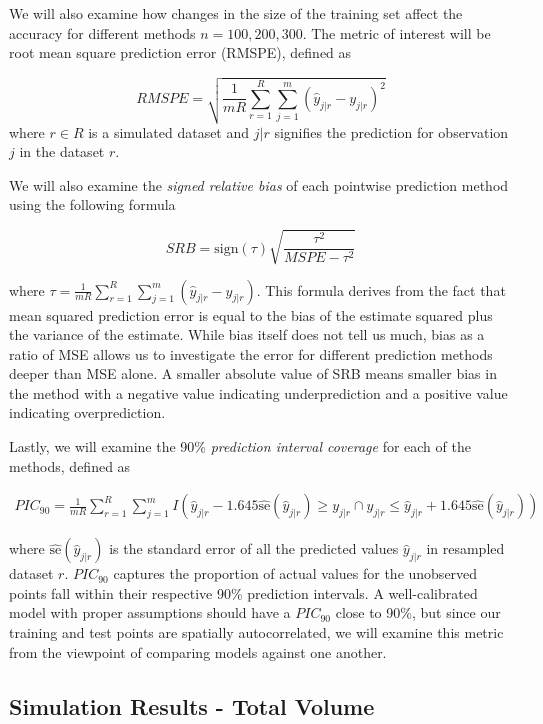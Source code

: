 \documentclass{article}
\begin{document}
We will also examine how changes in the size of the training set affect the accuracy for different methods $n = 100, 200, 300$.
The metric of interest will be root mean square prediction error (RMSPE), defined as

$$
RMSPE = \sqrt{\frac{1}{mR} \sum_{r=1}^R \sum_{j=1}^m (\hat{y}_{j|r} - y_{j|r})^2}
$$
where $r \in R$ is a simulated dataset and $j|r$ signifies the prediction for observation $j$ in the dataset $r$.

We will also examine the \textit{signed relative bias} of each pointwise prediction method using the following formula\cite{verhoef13}

$$
SRB = \text{sign}(\tau) \sqrt{\frac{\tau^2}{MSPE - \tau^2}}
$$

where $\tau = \frac{1}{mR} \sum_{r = 1}^R \sum_{j = 1}^m (\hat{y}_{j|r} - y_{j|r})$.
This formula derives from the fact that mean squared prediction error is equal to the bias of the estimate squared plus the variance of the estimate.
While bias itself does not tell us much, bias as a ratio of MSE allows us to investigate the error for different prediction methods deeper than MSE alone.
A smaller absolute value of SRB means smaller bias in the method with a negative value indicating underprediction and a positive value indicating overprediction.

Lastly, we will examine the 90\% \textit{prediction interval coverage} for each of the methods, defined as

\begin{align*}
PIC_{90} = \frac{1}{mR} \sum_{r=1}^R \sum_{j=1}^m I\left(\hat{y}_{j|r} - 1.645\hat{\text{se}}(\hat{y}_{j|r}) \geq y_{j|r} \cap y_{j|r} \leq \hat{y}_{j|r} + 1.645\hat{\text{se}}(\hat{y}_{j|r})\right)
\end{align*}

where $\hat{\text{se}}(\hat{y}_{j|r})$ is the standard error of all the predicted values $\hat{y}_{j|r}$ in resampled dataset $r$.\cite{verhoef13}
$PIC_{90}$ captures the proportion of actual values for the unobserved points fall within their respective 90\% prediction intervals.
A well-calibrated model with proper assumptions should have a $PIC_{90}$ close to 90\%, but since our training and test points are spatially autocorrelated, we will examine this metric from the viewpoint of comparing models against one another. 

\subsection{Simulation Results - Total Volume}
\end{document}
